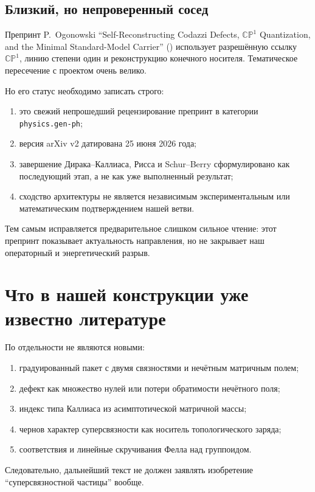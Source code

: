 \subsection{Близкий, но непроверенный сосед}

Препринт P.~Ogonowski ``Self-Reconstructing Codazzi Defects,
$\mathbb{CP}^1$ Quantization, and the Minimal Standard-Model Carrier''
() использует разрешённую ссылку
$\mathbb{CP}^1$, линию степени один и реконструкцию конечного носителя.
Тематическое пересечение с проектом очень велико.

Но его статус необходимо записать строго:
\begin{enumerate}
 \item это свежий непрошедший рецензирование препринт в категории
 \texttt{physics.gen-ph};
 \item версия arXiv v2 датирована 25 июня 2026 года;
 \item завершение Дирака--Каллиаса, Рисса и Schur--Berry сформулировано
 как последующий этап, а не как уже выполненный результат;
 \item сходство архитектуры не является независимым экспериментальным или
 математическим подтверждением нашей ветви.
\end{enumerate}

Тем самым исправляется предварительное слишком сильное чтение: этот
препринт показывает актуальность направления, но не закрывает наш
операторный и энергетический разрыв.

\section{Что в нашей конструкции уже известно литературе}

По отдельности не являются новыми:
\begin{enumerate}
 \item градуированный пакет с двумя связностями и нечётным матричным полем;
 \item дефект как множество нулей или потери обратимости нечётного поля;
 \item индекс типа Каллиаса из асимптотической матричной массы;
 \item чернов характер суперсвязности как носитель топологического заряда;
 \item соответствия и линейные скручивания Фелла над группоидом.
\end{enumerate}

Следовательно, дальнейший текст не должен заявлять изобретение
``суперсвязностной частицы'' вообще.

